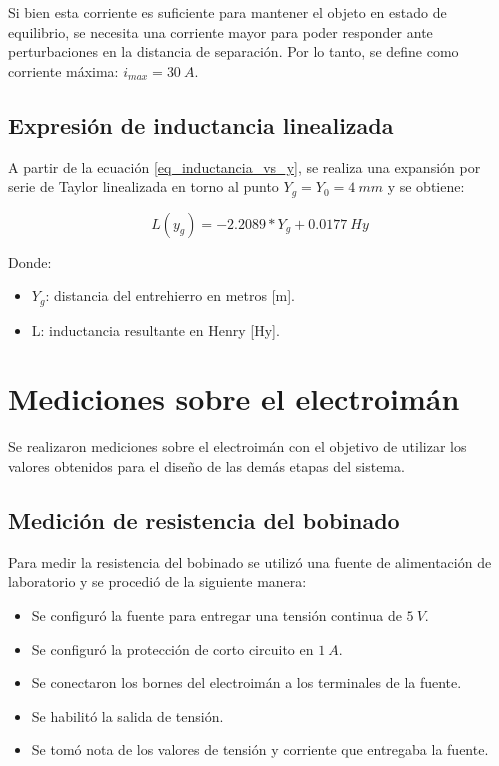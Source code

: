 \noindent Si bien esta corriente es suficiente para mantener el objeto en estado de equilibrio, se necesita una corriente mayor para poder responder ante perturbaciones en la distancia de separación. Por lo tanto, se define como corriente máxima: $i_{max}=30\:A$.


\subsection{Expresión de inductancia linealizada}
\label{secc_exp_ind_linealizada}
\noindent A partir de la ecuación \ref{eq_inductancia_vs_y}, se realiza una expansión por serie de Taylor linealizada en torno al punto $Y_{g}=Y_{0}=4\:mm$ y se obtiene:

\begin{equation} \label{eq_inductancia_lineal_teorica}
	L(y_{g})=-2.2089*Y_{g}+0.0177\:Hy
\end{equation}

\noindent Donde:
\begin{itemize}
	\item $Y_{g}$: distancia del entrehierro en metros [m].
	\item L: inductancia resultante en Henry [Hy].
\end{itemize}

\section{Mediciones sobre el electroimán}

\noindent Se realizaron mediciones sobre el electroimán con el objetivo de utilizar los valores obtenidos para el diseño de las demás etapas del sistema.

\subsection{Medición de resistencia del bobinado}

\noindent Para medir la resistencia del bobinado se utilizó una fuente de alimentación de laboratorio y se procedió de la siguiente manera:

\begin{itemize}
	\item Se configuró la fuente para entregar una tensión continua de $5\:V$.
	\item Se configuró la protección de corto circuito en $1\:A$.
	\item Se conectaron los bornes del electroimán a los terminales de la fuente.
	\item Se habilitó la salida de tensión.
	\item Se tomó nota de los valores de tensión y corriente que entregaba la fuente.
\end{itemize}

